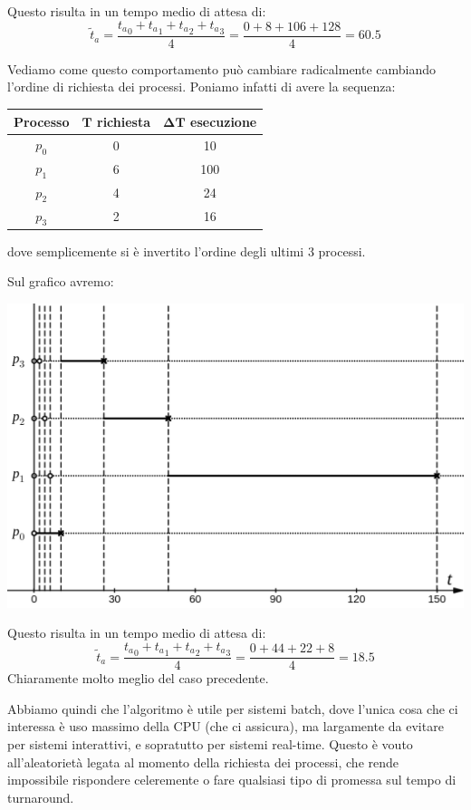 \documentclass[a4paper,11pt]{article}
\begin{document}
Questo risulta in un tempo medio di attesa di:
$$
\tilde{t}_a = \frac{{t_a}_0 + {t_a}_1 + {t_a}_2 + {t_a}_3}{4} = \frac{0 + 8 + 106 + 128}{4} = 60.5
$$

Vediamo come questo comportamento può cambiare radicalmente cambiando l'ordine di richiesta dei processi. Poniamo infatti di avere la sequenza:
\begin{table}[H]
	\center {}
	\begin{tabular} { c || c | c }
		\bfseries Processo & \bfseries $\mathbf{T}$ richiesta & \bfseries $\mathbf{\Delta T}$ esecuzione \\
		\hline
		$p_0$ & 0 & 10 \\ 
		$p_1$ & 6 & 100 \\ 
		$p_2$ & 4 & 24 \\ 
		$p_3$ & 2 & 16 
	\end{tabular}
\end{table}
dove semplicemente si è invertito l'ordine degli ultimi 3 processi. 

\newpage

Sul grafico avremo:
\begin{center}
	\includegraphics[scale=0.3]{../figures/fcfs_good.png}
\end{center}

Questo risulta in un tempo medio di attesa di:
$$
\tilde{t}_a = \frac{{t_a}_0 + {t_a}_1 + {t_a}_2 + {t_a}_3}{4} = \frac{0 + 44 + 22 + 8}{4} = 18.5
$$
Chiaramente molto meglio del caso precedente.

\par\smallskip

Abbiamo quindi che l'algoritmo è utile per sistemi batch, dove l'unica cosa che ci interessa è uso massimo della CPU (che ci assicura), ma largamente da evitare per sistemi interattivi, e sopratutto per sistemi real-time.
Questo è vouto all'aleatorietà legata al momento della richiesta dei processi, che rende impossibile rispondere celeremente o fare qualsiasi tipo di promessa sul tempo di turnaround.
\end{document}
